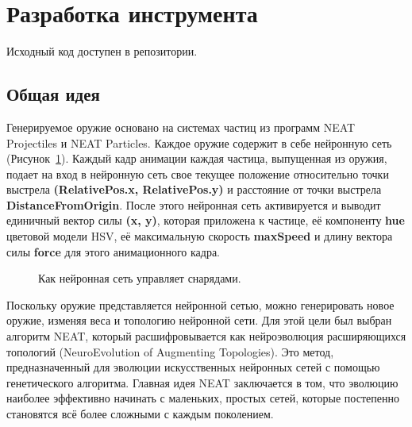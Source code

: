 ﻿\section{Разработка инструмента}

Исходный код доступен в репозитории\cite{s7}.

\subsection{Общая идея}

Генерируемое оружие основано на системах частиц из программ NEAT Projectiles и
NEAT Particles\cite{s2}\cite{s3}. Каждое оружие содержит в себе нейронную сеть (Рисунок~\ref{Weapon}). Каждый кадр анимации каждая частица, выпущенная из оружия, подает на вход в нейронную сеть свое текущее положение относительно точки выстрела {\small \textbf{(RelativePos.x, RelativePos.y)}} и расстояние от точки выстрела {\small \textbf{DistanceFromOrigin}}. После этого нейронная сеть активируется и выводит единичный вектор силы {\small \textbf{(x, y)}}, которая приложена к частице, её компоненту {\small \textbf{hue}} цветовой модели HSV, её максимальную скорость {\small \textbf{maxSpeed}} и длину вектора силы {\small \textbf{force}} для этого анимационного кадра.

\begin{figure}[ht]
    \begin{center}

        \caption{
            \label{Weapon}
            Как нейронная сеть управляет снарядами.}
    \end {center}
\end {figure}

Поскольку оружие представляется нейронной сетью, можно генерировать новое оружие, изменяя веса и топологию нейронной сети. Для этой цели был выбран алгоритм NEAT\cite{s1}, который расшифровывается как нейроэволюция расширяющихся топологий (NeuroEvolution of Augmenting Topologies). Это метод, предназначенный для эволюции искусственных нейронных сетей с помощью генетического алгоритма. Главная идея NEAT заключается в том, что эволюцию наиболее эффективно начинать с маленьких, простых сетей, которые постепенно становятся всё более сложными с каждым поколением.

